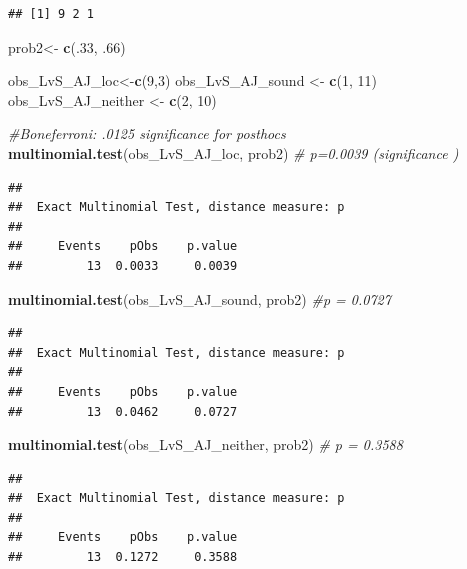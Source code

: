 \documentclass[]{article}
\newenvironment{Shaded}{\begin{snugshade}}{\end{snugshade}}
\newcommand{\KeywordTok}[1]{\textcolor[rgb]{0.13,0.29,0.53}{\textbf{{#1}}}}
\newcommand{\DecValTok}[1]{\textcolor[rgb]{0.00,0.00,0.81}{{#1}}}
\newcommand{\StringTok}[1]{\textcolor[rgb]{0.31,0.60,0.02}{{#1}}}
\newcommand{\CommentTok}[1]{\textcolor[rgb]{0.56,0.35,0.01}{\textit{{#1}}}}
\newcommand{\NormalTok}[1]{{#1}}
\begin{document}
\begin{verbatim}
## [1] 9 2 1
\end{verbatim}

\begin{Shaded}
\begin{Highlighting}[]
\NormalTok{prob2<-}\StringTok{ }\KeywordTok{c}\NormalTok{(.}\DecValTok{33}\NormalTok{, .}\DecValTok{66}\NormalTok{)}

\NormalTok{obs_LvS_AJ_loc<-}\KeywordTok{c}\NormalTok{(}\DecValTok{9}\NormalTok{,}\DecValTok{3}\NormalTok{)}
\NormalTok{obs_LvS_AJ_sound <-}\StringTok{ }\KeywordTok{c}\NormalTok{(}\DecValTok{1}\NormalTok{, }\DecValTok{11}\NormalTok{)}
\NormalTok{obs_LvS_AJ_neither <-}\StringTok{ }\KeywordTok{c}\NormalTok{(}\DecValTok{2}\NormalTok{, }\DecValTok{10}\NormalTok{)}

\CommentTok{#Boneferroni: .0125 significance for posthocs}
 \KeywordTok{multinomial.test}\NormalTok{(obs_LvS_AJ_loc, prob2) }\CommentTok{# p=0.0039 (significance )}
\end{Highlighting}
\end{Shaded}

\begin{verbatim}
## 
##  Exact Multinomial Test, distance measure: p
## 
##     Events    pObs    p.value
##         13  0.0033     0.0039
\end{verbatim}

\begin{Shaded}
\begin{Highlighting}[]
 \KeywordTok{multinomial.test}\NormalTok{(obs_LvS_AJ_sound, prob2) }\CommentTok{#p = 0.0727}
\end{Highlighting}
\end{Shaded}

\begin{verbatim}
## 
##  Exact Multinomial Test, distance measure: p
## 
##     Events    pObs    p.value
##         13  0.0462     0.0727
\end{verbatim}

\begin{Shaded}
\begin{Highlighting}[]
 \KeywordTok{multinomial.test}\NormalTok{(obs_LvS_AJ_neither, prob2) }\CommentTok{# p = 0.3588}
\end{Highlighting}
\end{Shaded}

\begin{verbatim}
## 
##  Exact Multinomial Test, distance measure: p
## 
##     Events    pObs    p.value
##         13  0.1272     0.3588
\end{verbatim}
\end{document}

